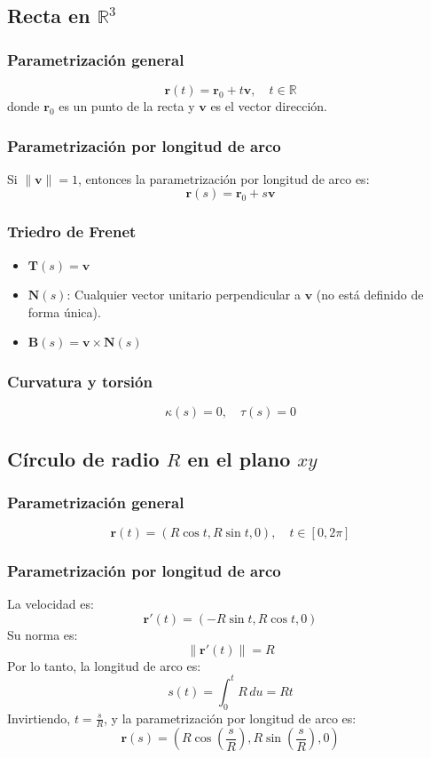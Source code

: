 \documentclass[11pt]{book}
\theoremstyle{definicion}
\theoremstyle{teorema}
\theoremstyle{ejemplo}
\begin{document}
\subsection{Recta en \(\mathbb{R}^3\)}

\subsubsection{Parametrización general}
\[
\mathbf{r}(t) = \mathbf{r}_0 + t\mathbf{v}, \quad t \in \mathbb{R}
\]
donde \(\mathbf{r}_0\) es un punto de la recta y \(\mathbf{v}\) es el vector dirección.

\subsubsection{Parametrización por longitud de arco}
\noindent Si \(\|\mathbf{v}\| = 1\), entonces la parametrización por longitud de arco es:
\[
\mathbf{r}(s) = \mathbf{r}_0 + s\mathbf{v}
\]

\subsubsection{Triedro de Frenet}
\begin{itemize}
    \item \(\mathbf{T}(s) = \mathbf{v}\)
    \item \(\mathbf{N}(s)\): Cualquier vector unitario perpendicular a \(\mathbf{v}\) (no está definido de forma única).
    \item \(\mathbf{B}(s) = \mathbf{v} \times \mathbf{N}(s)\)
\end{itemize}

\subsubsection{Curvatura y torsión}
\[
\kappa(s) = 0, \quad \tau(s) = 0
\]

\subsection{Círculo de radio \(R\) en el plano \(xy\)}

\subsubsection{Parametrización general}
\[
\mathbf{r}(t) = (R\cos t, R\sin t, 0), \quad t \in [0, 2\pi]
\]

\subsubsection{Parametrización por longitud de arco}
\noindent La velocidad es:
\[
\mathbf{r}'(t) = (-R\sin t, R\cos t, 0)
\]
Su norma es:
\[
\|\mathbf{r}'(t)\| = R
\]
Por lo tanto, la longitud de arco es:
\[
s(t) = \int_0^t R \, du = Rt
\]
Invirtiendo, \(t = \frac{s}{R}\), y la parametrización por longitud de arco es:
\[
\mathbf{r}(s) = \left(R\cos\left(\frac{s}{R}\right), R\sin\left(\frac{s}{R}\right), 0\right)
\]
\end{document}
